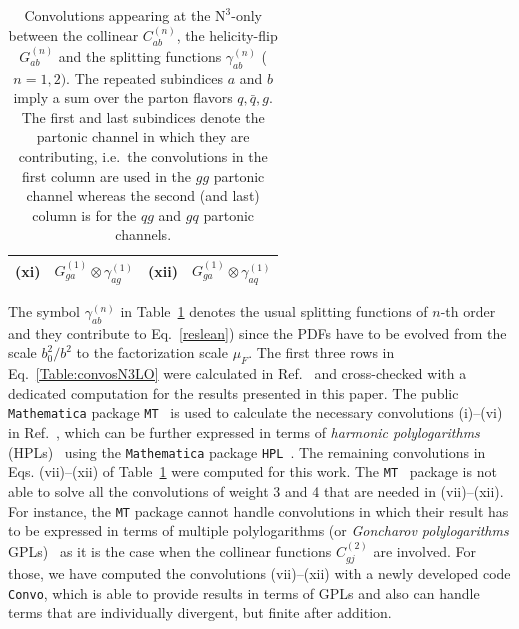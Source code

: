 \documentclass[12pt]{article}
\DeclareRobustCommand{\LO}{\text{LO}\xspace}
\DeclareRobustCommand{\N}[1]{\ensuremath{\text{N}^{#1}}} %
\begin{document}
\begin{appendix}
\begin{table}
\begin{tabular}{ |c|c||c|c| }
\multirow{1}{*}{(xi)} 

& $G^{(1)}_{ga}\otimes\gamma^{(1)}_{ag}$

& \multirow{1}{*}{(xii)} 

& $G^{(1)}_{ga}\otimes\gamma^{(1)}_{aq}$  \\

\hline
\end{tabular}
\caption{\label{Table:convosN3LO}
{Convolutions appearing at the \N3\LO-only between the collinear $C^{(n)}_{ab}$, the helicity-flip $G^{(n)}_{ab}$ and the splitting functions $\gamma^{(n)}_{ab}$ ($n=1,2)$. The repeated subindices $a$ and $b$ imply a sum over the parton flavors $q,\bar{q},g$.  The first and last subindices denote the partonic channel in which they are contributing, i.e.\ the convolutions in the first column are used in the $gg$ partonic channel whereas the second (and last) column is for the $qg$ and $gq$ partonic channels.
}}
\renewcommand{\arraystretch}{1}
\end{table}

The symbol $\gamma_{ab}^{(n)}$ in Table~\ref{Table:convosN3LO} denotes the usual splitting functions of $n$-th order and they contribute to Eq.~\eqref{reslean}) since the PDFs have to be evolved from the scale $b_0^2/b^2$ to the factorization scale $\mu_{F}$.
The first three rows in Eq.~\eqref{Table:convosN3LO} were calculated in Ref.~\cite{Hoeschele:2012xc} and cross-checked with a dedicated computation for the results presented in this paper. The public \texttt{Mathematica} package \texttt{MT}~\cite{Hoeschele:2013gga} is used to calculate the necessary convolutions (i)--(vi) in Ref.~\cite{Hoeschele:2012xc}, which can be further expressed in terms of \textit{harmonic polylogarithms} (HPLs)~\cite{Remiddi:1999ew} using the \texttt{Mathematica} package \texttt{HPL}~\cite{Maitre:2005uu}. 
The remaining convolutions in Eqs. (vii)--(xii) of Table~\ref{Table:convosN3LO}  were computed  for this work. The \texttt{MT}~\cite{Hoeschele:2013gga} package is not able to solve all the convolutions of weight 3 and 4 that are needed in (vii)--(xii). For instance, the \texttt{MT} package cannot handle convolutions in which their result has to be expressed in terms of multiple polylogarithms (or \emph{Goncharov polylogarithms} GPLs)~\cite{Goncharov:1998kja,Gehrmann:2000zt,Goncharov:2001iea} as it is the case when the collinear functions $C^{(2)}_{gj}$ are involved. For those, we have computed the convolutions (vii)--(xii) with a newly developed code \texttt{Convo}, which is able to provide results in terms of GPLs and also can handle terms that are individually divergent, but finite after addition.


\end{appendix}
\end{document}
